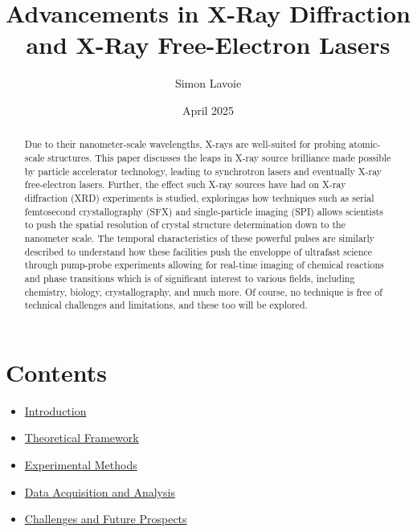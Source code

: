 \documentclass[aps,prb,twocolumn,superscriptaddress]{revtex4-2}
\begin{document}
\title{Advancements in X-Ray Diffraction and X-Ray Free-Electron Lasers}

\author{Simon Lavoie}
\date{April 2025}

\begin{abstract}
Due to their nanometer-scale wavelengths, X-rays are well-suited for probing
atomic-scale structures.  This paper discusses the leaps in X-ray source
brilliance made possible by particle accelerator technology, leading to
synchrotron lasers and eventually X-ray free-electron lasers. Further, the
effect such X-ray sources have had on X-ray diffraction (XRD) experiments is
studied, exploringas how techniques such as serial femtosecond crystallography
(SFX) and single-particle imaging (SPI) allows scientists to push the spatial
resolution of crystal structure determination down to the nanometer scale. The
temporal characteristics of these powerful pulses are similarly described to
understand how these facilities push the enveloppe of ultrafast science through
pump-probe experiments allowing for real-time imaging of chemical reactions and
phase transitions which is of significant interest to various fields, including
chemistry, biology, crystallography, and much more. Of course, no technique is
free of technical challenges and limitations, and these too will be explored.
\end{abstract}

\maketitle

\section*{Contents}
\begin{itemize}
    \item \hyperref[sec:intro]{Introduction}
    \item \hyperref[sec:theory]{Theoretical Framework}
    \item \hyperref[sec:experiment]{Experimental Methods}
    \item \hyperref[sec:data]{Data Acquisition and Analysis}
    \item \hyperref[sec:challenges]{Challenges and Future Prospects}
\end{itemize}
\end{document}
